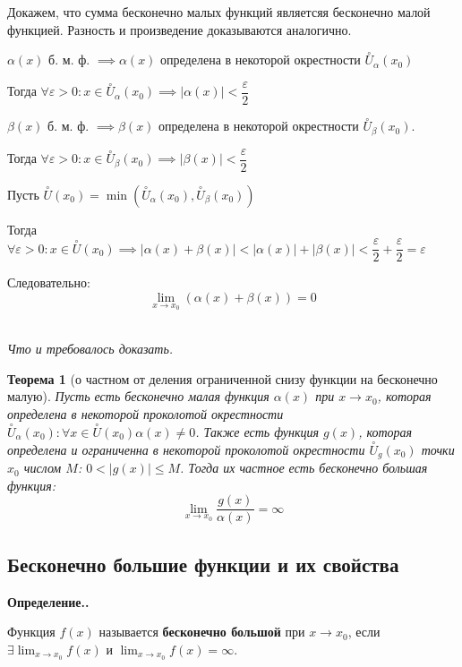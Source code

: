 \documentclass[a4paper,12pt,oneside]{extbook}
\newcommand{\newpar}{$ $\par\nobreak\ignorespaces}
\newenvironment{definition}[1][]{\noindent\textbf{Определение.\if\relax\detokenize{#1}\relax\else\;#1.\fi}\newpar}{\bigskip}
\theoremstyle{numbered}
\theoremstyle{unnumbered}
\newtheorem*{theorem*}{Теорема}
\theoremstyle{named}
\theoremstyle{unnumbered}
\theoremstyle{named}
\theoremstyle{named}
\theoremstyle{named}
\renewenvironment{proof}[1][]{\breakenv[Доказательство]{\if\relax\detokenize{#1}\relax\else\;\fi}{\textbf{#1}}}{\smallskip\newpar \hfill\textit{Что и требовалось доказать.}}
\begin{document}
\begin{proof}
    Докажем, что сумма бесконечно малых функций являетсяя бесконечно малой функцией. Разность и произведение доказываются аналогично.

    \(\alpha(x)\) б. м. ф. \(\implies \alpha(x)\) определена в некоторой окрестности \(\overset{\circ}{U}_\alpha(x_0)\)

    Тогда \(\forall \varepsilon > 0: x \in \overset{\circ}{U}_\alpha(x_0) \implies |\alpha(x)| < \dfrac{\varepsilon}{2}\)

    \(\beta(x)\) б. м. ф. \(\implies \beta(x)\) определена в некоторой окрестности \(\overset{\circ}{U}_\beta(x_0)\).

    Тогда \(\forall \varepsilon > 0: x \in \overset{\circ}{U}_\beta(x_0) \implies |\beta(x)| < \dfrac{\varepsilon}{2}\)

    Пусть \(\overset{\circ}{U}(x_0) = \min(\overset{\circ}{U}_\alpha(x_0), \overset{\circ}{U}_\beta(x_0))\)

    Тогда \(\forall \varepsilon > 0: x \in \overset{\circ}{U}(x_0) \implies |\alpha(x) + \beta(x)| < |\alpha(x)| + |\beta(x)| < \dfrac{\varepsilon}{2} + \dfrac{\varepsilon}{2} = \varepsilon\)

    Следовательно:
    \[
        \lim_{x \to x_0}{(\alpha(x) + \beta(x))} = 0
    \]
\end{proof}

\begin{theorem*}[о частном от деления ограниченной снизу функции на бесконечно малую]
    Пусть есть бесконечно малая функция \(\alpha(x)\) при \(x \to x_0\), которая определена в некоторой проколотой окрестности \(\overset{\circ}{U}_{\alpha}(x_0): \forall x \in \overset{\circ}{U}(x_0) \alpha(x) \neq 0\). Также есть функция \(g(x)\), которая определена и ограниченна в некоторой проколотой окрестности \(\overset{\circ}{U}_{g}(x_0)\) точки \(x_0\) числом \(M\): \(0 < |g(x)| \leq M\). Тогда их частное есть бесконечно большая функция:
    \[
        \lim_{x \to x_0}{\frac{g(x)}{\alpha(x)}} = \infty
    \]
\end{theorem*}

\subsection{Бесконечно большие функции и их свойства}%
\label{sec:Бесконечно большие функции и их свойства}

\begin{definition}
    Функция \(f(x)\) называется \textbf{бесконечно большой} при \(x \to x_0\), если \(\displaystyle \exists \lim_{x \to x_0}{f(x)}\) и \(\displaystyle \lim_{x \to x_0}{f(x)} = \infty\).
\end{definition}
\end{document}
